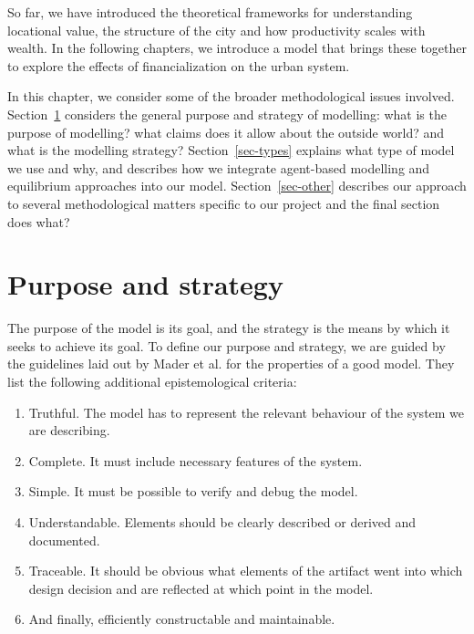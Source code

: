 So far, we have introduced the theoretical frameworks for understanding locational value, the structure of the city and how productivity scales with wealth. In the following chapters, we introduce a model that brings these together to explore the effects of financialization on the urban system. 

In this chapter, we consider some of the broader methodological issues involved. Section~\ref{sec-purpose} considers the general purpose and strategy of modelling: what is the purpose of modelling? what claims does it allow about the outside world? and what is the modelling strategy? Section~\ref{sec-types} explains what type of model we use and why, and describes how we integrate agent-based modelling and equilibrium approaches into our model.   %
Section~\ref{sec-other} describes our approach to several methodological matters specific to our project and the final section {\color{red} does what?}

\section{Purpose and strategy}\label{sec-purpose}

The purpose of the model is its goal, and the strategy is the means by which it seeks to achieve its goal. To define our purpose and strategy, we are guided by the guidelines laid out by  Mader et al. \cite{maderConstructionVerificationModels2007} for the  properties of a good model. %
They  list the  following additional epistemological criteria:
\begin{enumerate}   
\item  Truthful. The model has to represent the relevant behaviour of the system we are describing.
\item  Complete. It must include necessary features of the system.
\item Simple. It must be possible to verify and debug the model.
\item Understandable. Elements should be clearly described or derived and documented.
\item  Traceable.  It should be obvious what elements of the artifact went into which design decision and are reflected at which point in the model.
\item  And finally, efficiently constructable and maintainable.
\end{enumerate}

